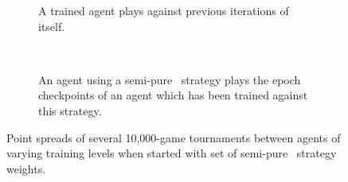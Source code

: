 
\begin{figure}
\center


\begin{subfigure}[b]{0.45\textwidth}
	\caption{A trained agent plays against previous iterations of itself.}
	\label{fig:expts-sanitycheck-spreads-a}
\end{subfigure}
~
\begin{subfigure}[b]{0.45\textwidth}
	\caption{
		An agent using a semi-pure \handmaxavg\ strategy
		plays the epoch checkpoints of an agent which has been trained
		against this strategy.
	}
	\label{fig:expts-sanitycheck-spreads-b}
\end{subfigure}

\caption{
	Point spreads of several 10,000-game tournaments between agents of varying
	training levels when started with set of semi-pure \handmaxavg\ strategy
	weights.
}
\label{fig:expts-sanitycheck-spreads}
\end{figure}
